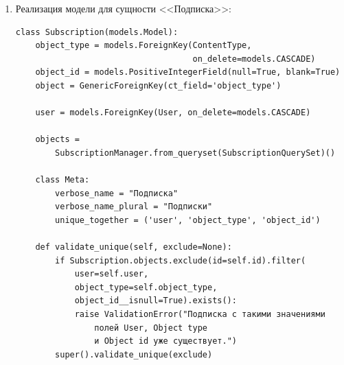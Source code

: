 \documentclass[12pt, a4paper, oneside]{article}
\begin{document}
\begin{enumerate}[wide, labelindent=0pt]
    \item {
        Реализация модели для сущности <<Подписка>>:\label{code:subscription}
        \begin{verbatim}
class Subscription(models.Model):
    object_type = models.ForeignKey(ContentType, 
                                    on_delete=models.CASCADE)
    object_id = models.PositiveIntegerField(null=True, blank=True)
    object = GenericForeignKey(ct_field='object_type')

    user = models.ForeignKey(User, on_delete=models.CASCADE)

    objects = 
        SubscriptionManager.from_queryset(SubscriptionQuerySet)()

    class Meta:
        verbose_name = "Подписка"
        verbose_name_plural = "Подписки"
        unique_together = ('user', 'object_type', 'object_id')

    def validate_unique(self, exclude=None):
        if Subscription.objects.exclude(id=self.id).filter(
            user=self.user, 
            object_type=self.object_type, 
            object_id__isnull=True).exists():
            raise ValidationError("Подписка с такими значениями 
                полей User, Object type 
                и Object id уже существует.")
        super().validate_unique(exclude)


\end{verbatim}}
\end{enumerate}
\end{document}

